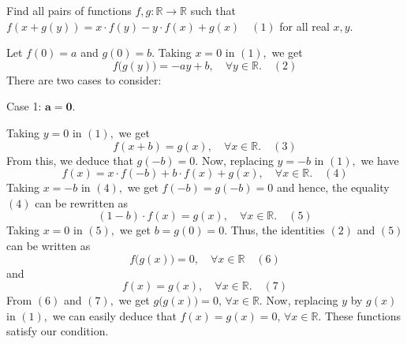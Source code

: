 \begin{mysolution}
	\begin{tcolorbox}Find all pairs of functions $ f, g : \mathbb R \to \mathbb R$ such that $ f \left( x + g(y) \right) = x \cdot f(y) - y \cdot f(x) + g(x)\quad (1)$ for all real $ x, y$.\end{tcolorbox}
Let $f(0)=a$ and $g(0)=b.$ Taking $x=0$ in $(1),$ we get \[f\big(g(y)\big)=-ay+b,\quad \forall y \in \mathbb R. \quad (2)\] There are two cases to consider:

\begin{bolded}Case 1: $\mathbf{a=0.}$\end{bolded} Taking $y=0$ in $(1),$ we get \[f(x+b)=g(x),\quad \forall x \in \mathbb R. \quad (3)\] From this, we deduce that $g({-b})=0.$ Now, replacing $y=-b$ in $(1),$ we have \[f(x)=x\cdot f({-b})+b\cdot f(x)+g(x),\quad \forall x \in \mathbb R. \quad (4)\] Taking $x=-b$ in $(4),$ we get $f({-b})=g({-b})=0$ and hence, the equality $(4)$ can be rewritten as \[(1-b)\cdot f(x)=g(x),\quad \forall x \in \mathbb R. \quad (5)\] Taking $x=0$ in $(5),$ we get $b=g(0)=0.$ Thus, the identities $(2)$ and $(5)$ can be written as \[f\big(g(x)\big)=0,\quad \forall x \in \mathbb R\quad (6)\] and \[f(x)=g(x),\quad \forall x \in \mathbb R. \quad (7)\] From $(6)$ and $(7),$ we get $g\big(g(x)\big)=0,\, \forall x \in \mathbb R.$ Now, replacing $y$ by $g(x)$ in $(1),$ we can easily deduce that $f(x)=g(x)=0,\, \forall x \in \mathbb R.$ These functions satisfy our condition.


\end{mysolution}
